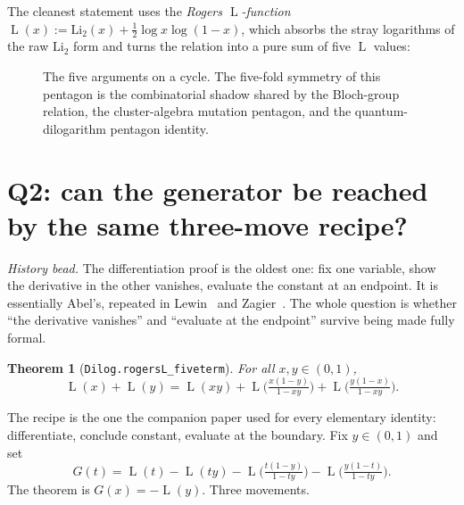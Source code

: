 \documentclass[11pt]{article}
\newtheorem{theorem}{Theorem}
\newcommand{\lean}[1]{\texttt{#1}}
\newcommand{\Li}{\mathrm{Li}_2}
\DeclareMathOperator{\Lrog}{L}
\newcommand{\keyeq}[1]{\begin{center}\keybox{$\displaystyle #1$}\end{center}}
\begin{document}
The cleanest statement uses the \emph{Rogers $\Lrog$-function}
$\Lrog(x):=\Li(x)+\tfrac12\log x\log(1-x)$, which absorbs the stray logarithms of the raw
$\Li$ form and turns the relation into a pure sum of five $\Lrog$ values:
\keyeq{\Lrog(x)+\Lrog(y)=\Lrog(xy)+\Lrog\!\Big(\tfrac{x(1-y)}{1-xy}\Big)
  +\Lrog\!\Big(\tfrac{y(1-x)}{1-xy}\Big),\qquad x,y\in(0,1).}

\begin{figure}[t]
\centering
{}
\caption{\label{fig:pentagon}The five arguments on a cycle. The five-fold symmetry of this
pentagon is the combinatorial shadow shared by the Bloch-group relation, the
cluster-algebra mutation pentagon, and the quantum-dilogarithm pentagon identity.}
\end{figure}

\section{Q2: can the generator be reached by the same three-move recipe?}\label{sec:proof}

\emph{History bead.} The differentiation proof is the oldest one: fix one variable, show
the derivative in the other vanishes, evaluate the constant at an endpoint. It is
essentially Abel's, repeated in Lewin~\cite{lewin} and Zagier~\cite{zagier}. The whole
question is whether ``the derivative vanishes'' and ``evaluate at the endpoint'' survive
being made fully formal.

\begin{theorem}[\lean{Dilog.rogersL\_fiveterm}]\label{thm:five}
For all $x,y\in(0,1)$,
\[
  \Lrog(x)+\Lrog(y)=\Lrog(xy)+\Lrog\!\Big(\tfrac{x(1-y)}{1-xy}\Big)
    +\Lrog\!\Big(\tfrac{y(1-x)}{1-xy}\Big).
\]
\end{theorem}

The recipe is the one the companion paper used for every elementary identity: differentiate,
conclude constant, evaluate at the boundary. Fix $y\in(0,1)$ and set
\[
  G(t)=\Lrog(t)-\Lrog(ty)-\Lrog\!\Big(\tfrac{t(1-y)}{1-ty}\Big)
    -\Lrog\!\Big(\tfrac{y(1-t)}{1-ty}\Big).
\]
The theorem is $G(x)=-\Lrog(y)$. Three movements.
\end{document}

